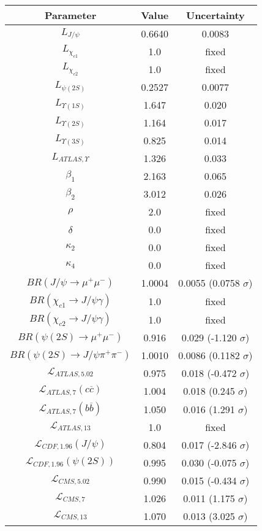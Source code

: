 \begin{table}[h!]
\centering
\begin{tabular}{c|c|c}
Parameter & Value & Uncertainty \\
\hline
$L_{J/\psi}$ & 0.6640 & 0.0083 \\
$L_{\chi_{c1}}$ & 1.0 & fixed \\
$L_{\chi_{c2}}$ & 1.0 & fixed \\
$L_{\psi(2S)}$ & 0.2527 & 0.0077 \\
$L_{\Upsilon(1S)}$ & 1.647 & 0.020 \\
$L_{\Upsilon(2S)}$ & 1.164 & 0.017 \\
$L_{\Upsilon(3S)}$ & 0.825 & 0.014 \\
$L_{ATLAS,\Upsilon}$ & 1.326 & 0.033 \\
$\beta_1$ & 2.163 & 0.065 \\
$\beta_2$ & 3.012 & 0.026 \\
$\rho$ & 2.0 & fixed \\
$\delta$ & 0.0 & fixed \\
$\kappa_2$ & 0.0 & fixed \\
$\kappa_4$ & 0.0 & fixed \\
$BR(J/\psi\rightarrow\mu^+\mu^-)$ & 1.0004 & 0.0055 (0.0758 $\sigma$) \\
$BR(\chi_{c1}\rightarrow J/\psi\gamma)$ & 1.0 & fixed \\
$BR(\chi_{c2}\rightarrow J/\psi\gamma)$ & 1.0 & fixed \\
$BR(\psi(2S)\rightarrow\mu^+\mu^-)$ & 0.916 & 0.029 (-1.120 $\sigma$) \\
$BR(\psi(2S)\rightarrow J/\psi\pi^+\pi^-)$ & 1.0010 & 0.0086 (0.1182 $\sigma$) \\
$\mathcal L_{ATLAS,5.02}$ & 0.975 & 0.018 (-0.472 $\sigma$) \\
$\mathcal L_{ATLAS,7}(c\overline c)$ & 1.004 & 0.018 (0.245 $\sigma$) \\
$\mathcal L_{ATLAS,7}(b\overline b)$ & 1.050 & 0.016 (1.291 $\sigma$) \\
$\mathcal L_{ATLAS,13}$ & 1.0 & fixed \\
$\mathcal L_{CDF,1.96}(J/\psi)$ & 0.804 & 0.017 (-2.846 $\sigma$) \\
$\mathcal L_{CDF,1.96}(\psi(2S))$ & 0.995 & 0.030 (-0.075 $\sigma$) \\
$\mathcal L_{CMS,5.02}$ & 0.990 & 0.015 (-0.434 $\sigma$) \\
$\mathcal L_{CMS,7}$ & 1.026 & 0.011 (1.175 $\sigma$) \\
$\mathcal L_{CMS,13}$ & 1.070 & 0.013 (3.025 $\sigma$) \\

\end{tabular}
\end{table}
